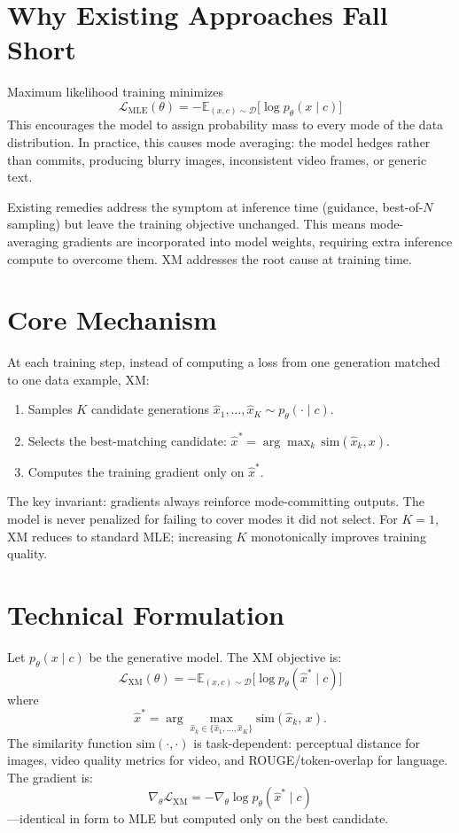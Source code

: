 \documentclass[10pt,twocolumn]{article}
\begin{document}
\section{Why Existing Approaches Fall Short}

Maximum likelihood training minimizes
\[
  \mathcal{L}_{\text{MLE}}(\theta) = -\mathbb{E}_{(x,c)\sim\mathcal{D}}\bigl[\log p_\theta(x \mid c)\bigr]
\]
This encourages the model to assign probability mass to every mode of the
data distribution. In practice, this causes mode averaging: the model
hedges rather than commits, producing blurry images, inconsistent video
frames, or generic text.

Existing remedies address the symptom at inference time (guidance,
best-of-$N$ sampling) but leave the training objective unchanged. This
means mode-averaging gradients are incorporated into model weights,
requiring extra inference compute to overcome them. XM addresses the root
cause at training time.

\section{Core Mechanism}

At each training step, instead of computing a loss from one generation
matched to one data example, XM:
\begin{enumerate}[itemsep=1pt,parsep=0pt]
  \item Samples $K$ candidate generations $\hat{x}_1,\ldots,\hat{x}_K \sim p_\theta(\cdot \mid c)$.
  \item Selects the best-matching candidate:
    $\hat{x}^* = \arg\max_k\, \mathrm{sim}(\hat{x}_k, x)$.
  \item Computes the training gradient only on $\hat{x}^*$.
\end{enumerate}

The key invariant: gradients always reinforce mode-committing outputs. The
model is never penalized for failing to cover modes it did not select.
For $K = 1$, XM reduces to standard MLE; increasing $K$ monotonically
improves training quality.

\section{Technical Formulation}

Let $p_\theta(x \mid c)$ be the generative model. The XM objective is:
\[
  \mathcal{L}_{\text{XM}}(\theta) = -\mathbb{E}_{(x,c)\sim\mathcal{D}}\bigl[\log p_\theta(\hat{x}^* \mid c)\bigr]
\]
where
\[
  \hat{x}^* = \arg\max_{\hat{x}_k \in \{\hat{x}_1,\ldots,\hat{x}_K\}}
               \mathrm{sim}(\hat{x}_k,\, x).
\]
The similarity function $\mathrm{sim}(\cdot,\cdot)$ is task-dependent:
perceptual distance for images, video quality metrics for video, and
ROUGE/token-overlap for language. The gradient is:
\[
  \nabla_\theta \mathcal{L}_{\text{XM}} =
    -\nabla_\theta \log p_\theta(\hat{x}^* \mid c)
\]
---identical in form to MLE but computed only on the best candidate.
\end{document}
